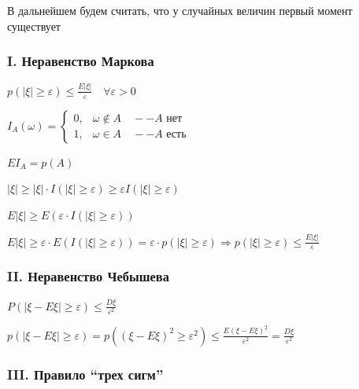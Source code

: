 \documentclass[12pt]{article}
\begin{document}
    В дальнейшем будем считать, что у случайных величин первый момент существует

    \subsubsection{I. Неравенство Маркова}

    \hypertarget{markovsinequality}{}

    \begin{MyTheorem}
        \Ths $p(|\xi| \geq \varepsilon) \leq \frac{E|\xi|}{\varepsilon} \quad \forall \varepsilon > 0$
    \end{MyTheorem}

    \begin{MyProof}
        $I_A(\omega) = \begin{cases}0, & \omega \notin A \quad -- A\text{ нет} \\ 1, & \omega \in A \quad -- A\text{ есть}\end{cases}$

        $EI_A = p(A)$

        $|\xi| \geq |\xi| \cdot I(|\xi| \geq \varepsilon) \geq \varepsilon I(|\xi| \geq \varepsilon)$

        $E|\xi| \geq E(\varepsilon \cdot I(|\xi| \geq \varepsilon))$

        $E|\xi| \geq \varepsilon \cdot E(I(|\xi| \geq \varepsilon)) = \varepsilon \cdot p(|\xi| \geq \varepsilon) 
        \Longrightarrow p(|\xi| \geq \varepsilon) \leq \frac{E|\xi|}{\varepsilon}$
    \end{MyProof}

    \hypertarget{chebyshevsinequality}{}

    \subsubsection{II. Неравенство Чебышева}

    \begin{MyTheorem}
        \Ths $P(|\xi - E\xi| \geq \varepsilon) \leq \frac{D\xi}{\varepsilon^2}$
    \end{MyTheorem}

    \begin{MyProof}
        $p(|\xi - E\xi| \geq \varepsilon) = p((\xi - E\xi)^2 \geq \varepsilon^2) \leq \frac{E(\xi - E\xi)^2}{\varepsilon^2} = \frac{D\xi}{\varepsilon^2}$
    \end{MyProof}

    \subsubsection{III. Правило \enquote{трех сигм}}
    
\end{document}
